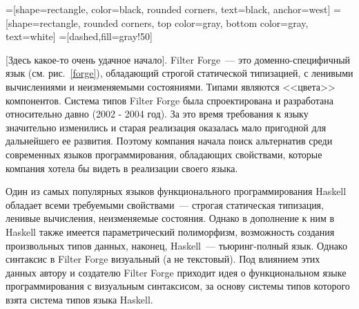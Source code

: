 


    =[shape=rectangle, color=black, rounded corners,%
    text=black, anchor=west]
    =[shape=rectangle, rounded corners,%
    top color=gray,%
    bottom color=gray, text=white]
    =[dashed,fill=gray!50]



\Intro
[Здесь какое-то очень удачное начало]. Filter Forge~--- это доменно-специфичный язык (см. рис.~\ref{forge}), обладающий строгой статической типизацией, с ленивыми вычислениями и неизменяемыми состояниями. Типами являются <<цвета>> компонентов. Система типов Filter Forge была спроектирована и разработана относительно давно (2002 - 2004 год). За это время требования к языку значительно изменились и старая реализация оказалась мало пригодной для дальнейшего ее развития. Поэтому компания начала поиск альтернатив среди современных языков программирования, обладающих свойствами, которые компания хотела бы видеть в реализации своего языка.

Один из самых популярных языков функционального программирования Haskell обладает всеми требуемыми свойствами~--- строгая статическая типизация, ленивые вычисления, неизменяемые состояния. Однако в дополнение к ним в Haskell также имеется параметрический полиморфизм, возможность создания произвольных типов данных, наконец, Haskell~--- тьюринг-полный язык. Однако синтаксис в Filter Forge визуальный (а не текстовый). Под влиянием этих данных автору и создателю Filter Forge приходит идея о функциональном языке программирования с визуальным синтаксисом, за основу  системы типов которого взята система типов языка Haskell.


